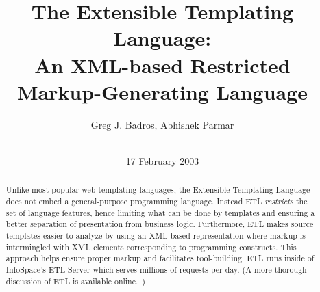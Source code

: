 \documentclass{www2003-submission}
\newcommand{\etl}{ETL}
\begin{document}
%
\title{The Extensible Templating Language: \\
       An XML-based Restricted Markup-Generating Language\vspace*{-.2in}}


\author{
%
\alignauthor Greg J. Badros, Abhishek Parmar\\
       \\
       }

\date{17 February 2003}
\maketitle
\vspace*{-.9in}
\begin{abstract}
{ \small Unlike most popular web templating languages, the Extensible
Templating Language does not embed a general-purpose programming
language. Instead \etl{} \emph{restricts} the set of language features, hence
limiting what can be done by templates and ensuring a better
separation of presentation from business logic. Furthermore,
\etl{} makes source templates easier to analyze by using an
XML-based representation where markup is intermingled with XML
elements corresponding to programming constructs. This approach helps
ensure proper markup and facilitates tool-building. \etl{} runs inside
of InfoSpace's ETL Server which serves millions of requests per
day. (A more thorough discussion of ETL is available
online.~\cite{ETL-full})}


\end{abstract}



\end{document}
